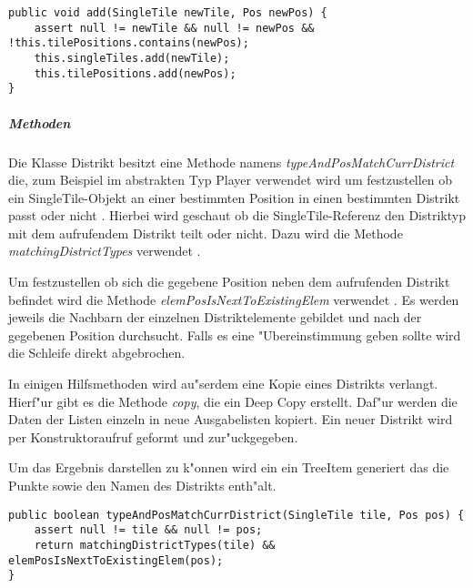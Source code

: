 \begin{lstlisting}[style=CodeHighlighting,float,caption=District - add,label=district_add]
public void add(SingleTile newTile, Pos newPos) {
    assert null != newTile && null != newPos && !this.tilePositions.contains(newPos);
    this.singleTiles.add(newTile);
    this.tilePositions.add(newPos);
}
\end{lstlisting}

\subparagraph{Methoden}
\label{spar:districtMethoden}
Die Klasse Distrikt besitzt eine Methode namens \emph{typeAndPosMatchCurrDistrict} die, zum Beispiel im abstrakten Typ Player verwendet wird um festzustellen ob ein SingleTile-Objekt an einer bestimmten Position in einen bestimmten Distrikt passt oder nicht . Hierbei wird geschaut ob die SingleTile-Referenz den Distriktyp mit dem aufrufendem Distrikt teilt oder nicht. Dazu wird die Methode \emph{matchingDistrictTypes} verwendet .

Um festzustellen ob sich die gegebene Position neben dem aufrufenden Distrikt befindet wird die Methode \emph{elemPosIsNextToExistingElem} verwendet . Es werden jeweils die Nachbarn der einzelnen Distriktelemente gebildet und nach der gegebenen Position durchsucht. Falls es eine "Ubereinstimmung geben sollte wird die Schleife direkt abgebrochen. 

In einigen Hilfsmethoden wird au"serdem eine Kopie eines Distrikts verlangt. Hierf"ur gibt es die Methode \emph{copy}, die ein Deep Copy erstellt. Daf"ur werden die Daten der Listen einzeln in neue Ausgabelisten kopiert. Ein neuer Distrikt wird per Konstruktoraufruf geformt und zur"uckgegeben. 

Um das Ergebnis darstellen zu k"onnen wird ein ein TreeItem generiert das die Punkte sowie den Namen des Distrikts enth"alt. 


\begin{lstlisting}[style=CodeHighlighting,float,caption=District - typeAndPosMatchCurrDistrict,label=lst:district_typeAndPosMatchCurrDistrict]
public boolean typeAndPosMatchCurrDistrict(SingleTile tile, Pos pos) {
    assert null != tile && null != pos;
    return matchingDistrictTypes(tile) && elemPosIsNextToExistingElem(pos);
}
\end{lstlisting}

